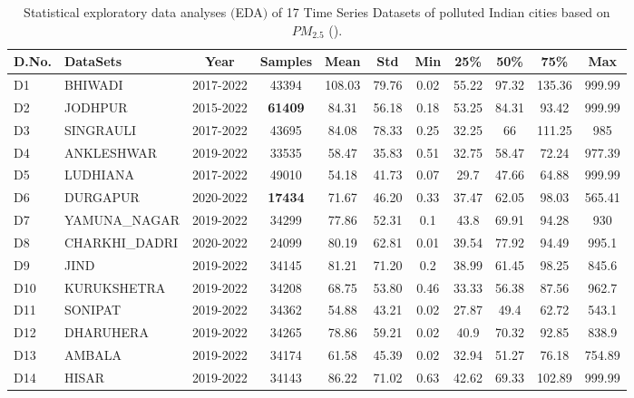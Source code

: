 \documentclass[a4paper,fleqn]{cas-dc}
\begin{document}
\begin{table}[h!]
  \caption{Statistical exploratory data analyses $($EDA$)$ of 17 Time Series Datasets of polluted Indian cities based on $PM_{2.5}$ (\cite{bhawan2020central}).}
  \label{Eda1}
  
  \begin{tabular}{llccccccccc}
  \hline
  
  D.No. & DataSets & Year  & Samples &Mean &Std & Min &25\% &50\% &75\% & Max\\ \hline
  
 D1 &  BHIWADI          & 2017-2022  & 43394   & 108.03 & 79.76  & 0.02 & 55.22   & 97.32       & 135.36 & 999.99 \\ 
 D2 &  JODHPUR     & 2015-2022 &\textbf{61409} & 84.31 & 56.18 & 0.18 & 53.25   & 84.31 & 93.42   & 999.99 \\
 D3 &  SINGRAULI    & 2017-2022 & 43695   & 84.08 & 78.33 & 0.25 & 32.25   & 66          & 111.25  & 985    \\
 D4 &  ANKLESHWAR   & 2019-2022  & 33535     & 58.47 & 35.83 & 0.51 & 32.75   & 58.47 & 72.24   & 977.39 \\ 
 D5 &  LUDHIANA        & 2017-2022  & 49010  & 54.18 & 41.73 & 0.07 & 29.7    & 47.66       & 64.88   & 999.99 \\
 D6 &  DURGAPUR       & 2020-2022 & \textbf{17434}   & 71.67 & 46.20 & 0.33 & 37.47 & 62.05      & 98.03 & 565.41 \\ 
 D7 &  YAMUNA\_NAGAR  & 2019-2022 & 34299   & 77.86  & 52.31 & 0.1  & 43.8    & 69.91       & 94.28   & 930    \\
 D8 &  CHARKHI\_DADRI  & 2020-2022  & 24099   & 80.19 & 62.81 & 0.01 & 39.54  & 77.92       & 94.49  & 995.1  \\ 
 D9 &  JIND             & 2019-2022 & 34145 & 81.21 & 71.20 & 0.2  & 38.99   & 61.45       & 98.25   & 845.6  \\ 
 D10 &  KURUKSHETRA    & 2019-2022  & 34208 & 68.75& 53.80 & 0.46 & 33.33   & 56.38       & 87.56   & 962.7  \\ 
 D11 &  SONIPAT        & 2019-2022  & 34362  & 54.88 & 43.21  & 0.02 & 27.87   & 49.4        & 62.72   & 543.1  \\ 
 D12 &  DHARUHERA     & 2019-2022 & 34265 & 78.86 & 59.21 & 0.02 & 40.9    & 70.32       & 92.85   & 838.9  \\
 D13 &  AMBALA         & 2019-2022 & 34174 & 61.58 & 45.39 & 0.02 & 32.94   & 51.27       & 76.18 & 754.89 \\
 D14 &  HISAR          & 2019-2022 & 34143 & 86.22 & 71.02 & 0.63 & 42.62   & 69.33       & 102.89 & 999.99 \\ 

\end{tabular}
\end{table}
\end{document}
